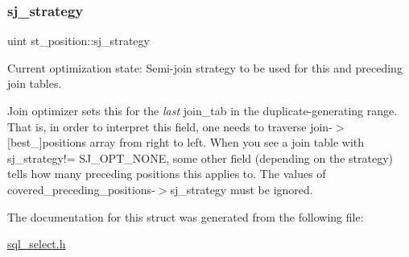 \subsubsection{\texorpdfstring{sj\+\_\+strategy}{sj\_strategy}}
{\footnotesize\ttfamily uint st\+\_\+position\+::sj\+\_\+strategy}

Current optimization state\+: Semi-\/join strategy to be used for this and preceding join tables.

Join optimizer sets this for the {\itshape last} join\+\_\+tab in the duplicate-\/generating range. That is, in order to interpret this field, one needs to traverse join-\/$>$\mbox{[}best\+\_\+\mbox{]}positions array from right to left. When you see a join table with sj\+\_\+strategy!= S\+J\+\_\+\+O\+P\+T\+\_\+\+N\+O\+NE, some other field (depending on the strategy) tells how many preceding positions this applies to. The values of covered\+\_\+preceding\+\_\+positions-\/$>$sj\+\_\+strategy must be ignored. 

The documentation for this struct was generated from the following file\+:\begin{DoxyCompactItemize}
\item 
\mbox{\hyperlink{sql__select_8h}{sql\+\_\+select.\+h}}\end{DoxyCompactItemize}
